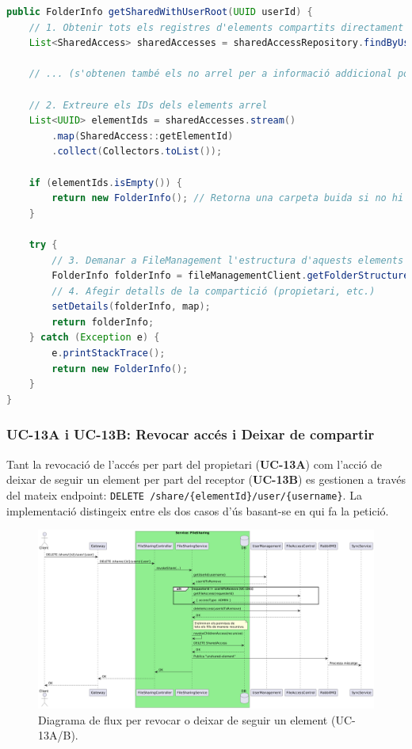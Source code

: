 \begin{lstlisting}[language=Java, caption={Construcció de la carpeta virtual d'elements compartits a `FileSharingService`}]
public FolderInfo getSharedWithUserRoot(UUID userId) {
    // 1. Obtenir tots els registres d'elements compartits directament amb l'usuari
    List<SharedAccess> sharedAccesses = sharedAccessRepository.findByUserIdAndRoot(userId, true);
    
    // ... (s'obtenen també els no arrel per a informació addicional posterior) ...

    // 2. Extreure els IDs dels elements arrel
    List<UUID> elementIds = sharedAccesses.stream()
        .map(SharedAccess::getElementId)
        .collect(Collectors.toList());

    if (elementIds.isEmpty()) {
        return new FolderInfo(); // Retorna una carpeta buida si no hi ha res compartit
    }

    try {
        // 3. Demanar a FileManagement l'estructura d'aquests elements
        FolderInfo folderInfo = fileManagementClient.getFolderStructure(elementIds, false);
        // 4. Afegir detalls de la compartició (propietari, etc.)
        setDetails(folderInfo, map);
        return folderInfo;
    } catch (Exception e) {
        e.printStackTrace();
        return new FolderInfo();
    }
}
\end{lstlisting}

\subsubsection{UC-13A i UC-13B: Revocar accés i Deixar de compartir}

Tant la revocació de l'accés per part del propietari (\textbf{UC-13A}) com l'acció de deixar de seguir un element per part del receptor (\textbf{UC-13B}) es gestionen a través del mateix endpoint: \texttt{DELETE /share/\{elementId\}/user/\{username\}}. La implementació distingeix entre els dos casos d'ús basant-se en qui fa la petició.

\begin{figure}[H]
    \centering
    \includegraphics[width=\textwidth]{Figures/flux/revoke_share.png}
    \caption{Diagrama de flux per revocar o deixar de seguir un element (UC-13A/B).}
\end{figure}

